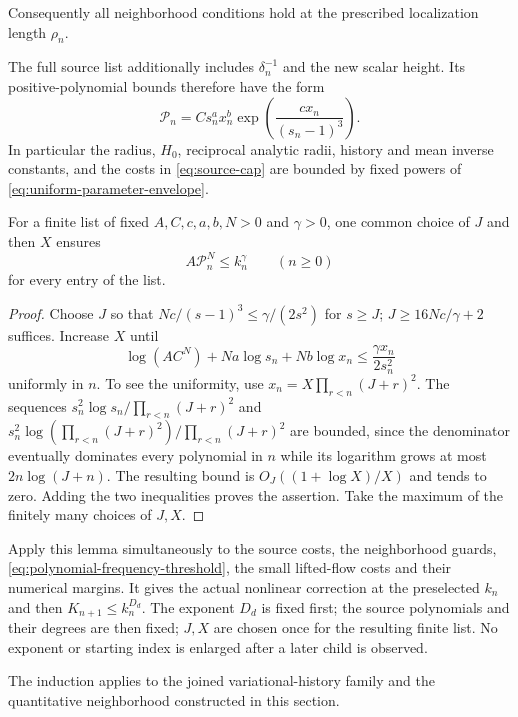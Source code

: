 Consequently all neighborhood conditions hold at the prescribed
localization length $\rho_n$.

The full source list additionally includes $\delta_n^{-1}$ and the
new scalar height. Its positive-polynomial bounds therefore have the
form
\begin{equation}\label{eq:uniform-parameter-envelope}
 \mathcal P_n=Cs_n^a x_n^b
              \exp\left(\frac{c x_n}{(s_n-1)^3}\right).
\end{equation}
In particular the radius, $H_0$, reciprocal analytic radii, history
and mean inverse constants, and the costs in \eqref{eq:source-cap}
are bounded by fixed powers of \eqref{eq:uniform-parameter-envelope}.

\begin{lemma}\label{lem:uniform-source-domination}
For a finite list of fixed $A,C,c,a,b,N>0$ and $\gamma>0$, one common
choice of $J$ and then $X$ ensures
\[
 A\mathcal P_n^N\leq k_n^\gamma\qquad(n\geq0)
\]
for every entry of the list.
\end{lemma}
\begin{proof}
Choose $J$ so that
$Nc/(s-1)^3\leq\gamma/(2s^2)$ for $s\geq J$;
$J\geq16Nc/\gamma+2$ suffices. Increase $X$ until
\[
 \log(AC^N)+Na\log s_n+Nb\log x_n
 \leq\frac{\gamma x_n}{2s_n^2}
\]
uniformly in $n$. To see the uniformity, use
$x_n=X\prod_{r<n}(J+r)^2$.
The sequences
$s_n^2\log s_n/\prod_{r<n}(J+r)^2$ and
$s_n^2\log(\prod_{r<n}(J+r)^2)/\prod_{r<n}(J+r)^2$
are bounded, since the denominator eventually dominates every
polynomial in $n$ while its logarithm grows at most
$2n\log(J+n)$. The resulting bound is
$O_J((1+\log X)/X)$ and tends to zero.
Adding the two inequalities proves the assertion. Take the maximum
of the finitely many choices of $J,X$.
\end{proof}

Apply this lemma simultaneously to the source costs, the neighborhood
guards, \eqref{eq:polynomial-frequency-threshold}, the small lifted-flow
costs and their numerical margins. It gives the actual nonlinear
correction at the preselected $k_n$ and then
$K_{n+1}\leq k_n^{D_d}$. The exponent $D_d$ is fixed first;
the source polynomials and their degrees are then fixed; $J,X$ are
chosen once for the resulting finite list. No exponent or starting
index is enlarged after a later child is observed.

The induction applies to the joined variational-history family and
the quantitative neighborhood constructed in this section.
